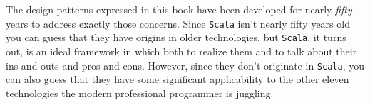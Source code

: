 The design patterns expressed in this book have been developed for
nearly \emph{fifty} years to address exactly those concerns. Since
\texttt{Scala} isn't nearly fifty years old you can guess that they
have origins in older technologies, but \texttt{Scala}, it turns out,
is an ideal framework in which both to realize them and to talk about
their ins and outs and pros and cons. However, since they don't
originate in \texttt{Scala}, you can also guess that they have some
significant applicability to the other eleven technologies the modern
professional programmer is juggling.

